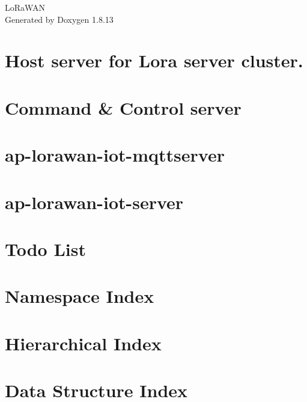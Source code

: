 \documentclass[twoside]{book}
\newcommand{\+}{\discretionary{\mbox{\scriptsize$\hookleftarrow$}}{}{}}
\newcommand{\clearemptydoublepage}{%
  \newpage{\pagestyle{empty}\cleardoublepage}%
}
\begin{document}
\begin{titlepage}
\vspace*{7cm}
\begin{center}%
{\Large Lo\+Ra\+W\+AN }\\
\vspace*{1cm}
{\large Generated by Doxygen 1.8.13}\\
\end{center}
\end{titlepage}
\clearemptydoublepage
{}
\tableofcontents
\clearemptydoublepage
{}

\chapter{Host server for Lora server cluster.}
\label{md__r_e_a_d_m_e}

\chapter{Command \& Control server}
\label{md_servers_cacserver__r_e_a_d_m_e}

\chapter{ap-\/lorawan-\/iot-\/mqttserver}
\label{md_servers_mqttserver__r_e_a_d_m_e}

\chapter{ap-\/lorawan-\/iot-\/server}
\label{md_servers_webserver__r_e_a_d_m_e}

\chapter{Todo List}
\label{todo}

\chapter{Namespace Index}

\chapter{Hierarchical Index}

\chapter{Data Structure Index}

\end{document}
